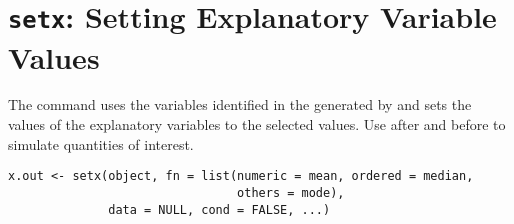  \section{{\tt setx}: Setting Explanatory Variable Values}\label{ss:setx}
\begin{Description}\relax
The  command uses the variables identified in
the  generated by  and sets the values of
the explanatory variables to the selected values.  Use 
after  and before  to simulate quantities of
interest.
\end{Description}
\begin{Usage}
\begin{verbatim}
x.out <- setx(object, fn = list(numeric = mean, ordered = median, 
                                others = mode), 
              data = NULL, cond = FALSE, ...)
\end{verbatim}
\end{Usage}
